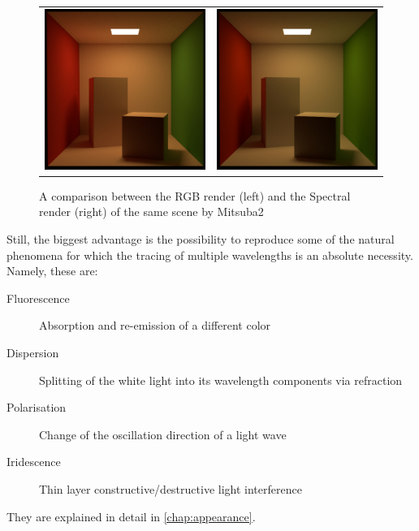 \begin{figure}[httpb]
	\begin{tabular}{cc}
		\includegraphics[width=.45\linewidth]{img/rgb.jpg}
		&
		\includegraphics[width=.45\linewidth]{img/spectral.jpg}
	\end{tabular}
	\caption{A comparison between the RGB render (left) and the Spectral render (right) of the same scene by Mitsuba2~\cite{mitsubaWeb}}
	\label{fig:compare_color}
\end{figure}

Still, the biggest advantage is the possibility to reproduce some of the natural phenomena for which the tracing of multiple wavelengths is an absolute necessity. Namely, these are:
\begin{description}
	\item[Fluorescence] Absorption and re-emission of a different color
	\item[Dispersion] Splitting of the white light into its wavelength components via refraction
	\item[Polarisation] Change of the oscillation direction of a light wave 
	\item[Iridescence] Thin layer constructive/destructive light interference
\end{description}
They are explained in detail in \autoref{chap:appearance}.

